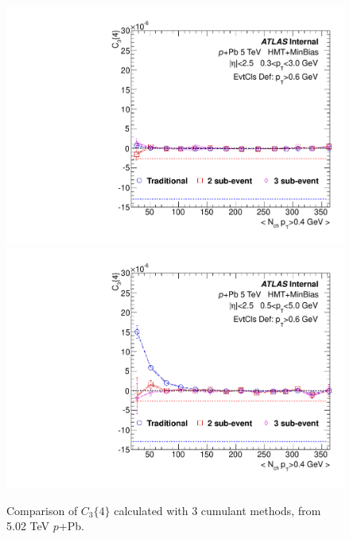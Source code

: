 \begin{figure}[p]
\includegraphics[width=0.4\linewidth]{figs/sec_result/pPb5/phy_4PC_Har1_Pt0_Cls3.pdf}
\includegraphics[width=0.4\linewidth]{figs/sec_result/pPb5/phy_4PC_Har1_Pt1_Cls3.pdf}
\caption{Comparison of $C_{3}\{4\}$ calculated with 3 cumulant methods, from 5.02 TeV $p$+Pb.}
\label{fig:result_pPb5_C34}
\end{figure}
\clearpage



